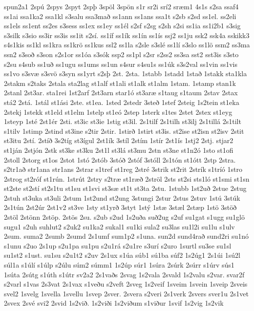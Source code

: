 {spun2a1
2spú
2spys
2spyt
2spþ
3spöl
3spön
s1r
sr2i
srí2
sræm1
4s1s
s2sa
ssaf4
ss1ai
ssa1ka2
ssa1kl
s3salu
ssa3mað
ss1ann
ss1ans
ssa1t
s2sb
s2sd
ss1el.
ss2eli
ss1els
ss1ent
ss2es
s3sess
ss1ex
ss1ey
ss1él
s2sf
s2sg
s2sh
s2si
ss1ia
ss1i2b1
s3sig
s3silk
s3sio
ss3ir
ss3is
ss1it
s2sí.
ss1íf
ss1ík
ss1ín
ss1ís
ssj2
ss1ju
ssk2
ssk4a
sskikk3
s4s1kis
ss1kl
ss1kra
ss1krö
ss1kus
ssl2
ss1la
s2sle
s3slé
ss1lí
s3slo
ss1lö
ssm2
ss3ma
ssn2
s3soð
s3son
s2s1or
ss1óa
s3sók
ssp2
ss1pl
s2sr
s2ss2
ss3sa
sst2
sst3is
s3sto
s2su
s4sub
ss1uð
ss1ugu
ss1ums
ss1un
s4sur
s4su1s
ss1úk
s3s2val
ss1vin
ss1vis
ss1vo
s3svæ
s3svö
s3syn
ss1yrt
s2sþ
2st.
2sta.
1stabb
1stadd
1stað
1stakk
sta1kla
2stakm
s2taks
2stala
sta2lag
st1alf
st1ali
st1alk
st1alm
1stam.
1stamp
stan1k
2stanl
2st3ar.
sta1rei
1st2arf
2st3arn
star1ó
st3aræ
s1taug
s1taum
2stav
2stax
stá2
2stá.
1stál
st1ási
2ste.
st1ea.
1sted
2stedr
3steð
1stef
2steig
1s2tein
st1eka
2stekj
1stekk
st1eld
st1elm
1stelp
st1eó
2step
1sterk
s1tes
2stet
2stex
st1eyg
1steyp
1sté
2st1ér
2sti.
st3ic
st3ie
1stig
st3il.
2s1tilf
2s1tilh
st3ilj
2s1tillá
2s1tilt
s1tilv
1stimp
2stind
st3ine
s2tir
2stir.
1stirð
1stirt
st3is.
st2ise
st2isn
st2isv
2stit
st3itu
2stí.
2stíð
3s2tíg
st3ígul
2st1ík
3stíl
2stím
1stír
2st1ís
1stj2
2stj.
stjar2
st1ján
2stjón
2stk
st3ke
st3ku
2st1l
st3lá
st3mu
2stn
st3ne
st1n2ó
1sto
st1ofi
2stoll
2storg
st1os
2stot
1stó
2stób
3stóð
2stóf
3stóll
2s1tón
st1ótt
2stp
2stra.
s2tr1að
str1ana
str1ans
2strar
s1tref
st1reg
2stré
3strik
st2rit
2strík
s1tríó
1stro
2strog
st2róf
st1rún.
1strút
2stry
s2træ
st1ræð
2ströl
2sts
st2si
sts1ló
st1smi
st1sn
st2ste
st2stí
st2s1tu
st1su
st1svi
st3sæ
st1t
st3ta
2stu.
1stubb
1st2uð
2stue
2stug
2stuh
st3uka
st3uli
2stum
1st2und
st2ung
3stungi
2stur
2stus
2stuv
1stú
3stúk
2s1tún
2st2úr
2st1v2
st3ve
1sty
st1yrð
3styt
1stý
1stæ
3stæl
2stæp
1stö
3stöð
2stöl
2stönn
2stöp.
2stös
2su.
s2ub
s2ud
1s2uða
suð2ug
s2uf
su1gat
s1ugg
su1glö
sugu1
s2uh
suhlut2
s2uk2
su1ka2
sukal1
su1ki
sula2
su3las
su1l2i
su1lu
s1ulv
2sum.
suma2
2sumb
2sumd
2s1umf
sum1p2
s1una.
sun2d
sund4rað
sund2ri
su1nó
s1unu
s2uo
2s1up
s2u1pa
su1pu
s2u1rá
s2u1re
s3urí
s2uro
1surtl
su3se
su1sl
su1st2
s1ust.
su1su
s2u1t2
s2uv
2s1ux
s1úa
súb1
sú1ba
súf2
1s2úg1
2s1úi
1sú2l
súl1a
s1úlí
s1úlp
s2úlu
súm2
súmm1
1s2úp
súr1
1súra
2súrk
2súrr
s1úrv
sús1
1súta
2sútg
s1úth
s1útr
sv2a2
2s1vaðs
2svag
1s2vala
2svald
1s2valu
s2var.
svar2f
s2varl
s1vas
2s3vat
2s1vax
s1veðu
s2veft
2sveg
1s2veif
1sveim
1svein
1sveip
2sveis
svel2
1svelg
1svella
1svellu
1svep
2sver.
2svera
s2veri
2s1verk
2svers
sver1u
2s1vet
2svex
2své
svi2
2svid
1s2við.
1s2viði
1s2viðum
s1viður
1svif
1s2vig
1s2vik
}

